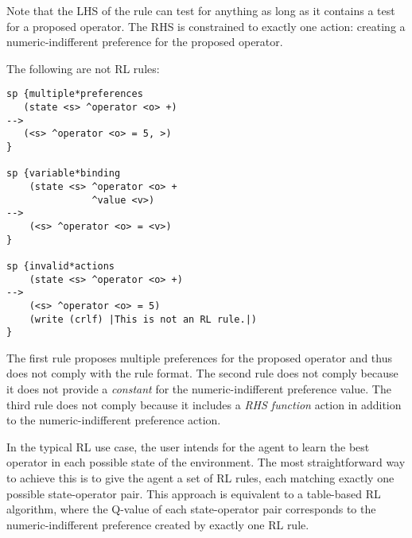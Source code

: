 Note that the LHS of the rule can test for anything as long as it contains a test for a proposed operator.
The RHS is constrained to exactly one action: creating a numeric-indifferent preference for the proposed operator.

The following are not RL rules:

\begin{verbatim}
sp {multiple*preferences
   (state <s> ^operator <o> +)
-->
   (<s> ^operator <o> = 5, >)
}

sp {variable*binding
    (state <s> ^operator <o> +
               ^value <v>)
-->
    (<s> ^operator <o> = <v>)
}

sp {invalid*actions
    (state <s> ^operator <o> +)
-->
    (<s> ^operator <o> = 5)
    (write (crlf) |This is not an RL rule.|)
}
\end{verbatim}

The first rule proposes multiple preferences for the proposed operator and thus does not comply with the rule format.
The second rule does not comply because it does not provide a \emph{constant} for the numeric-indifferent preference value.
The third rule does not comply because it includes a \textit{RHS function} action in addition to the numeric-indifferent preference action.

In the typical RL use case, the user intends for the agent to learn the best operator in each possible state of the environment.
The most straightforward way to achieve this is to give the agent a set of RL rules, each matching exactly one possible state-operator pair.
This approach is equivalent to a table-based RL algorithm, where the Q-value of each state-operator pair corresponds to the numeric-indifferent preference created by exactly one RL rule.


